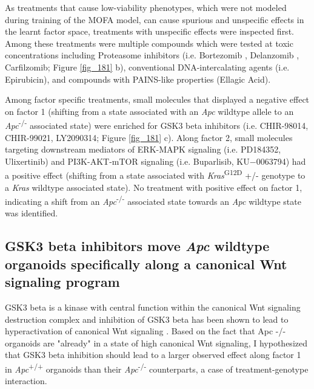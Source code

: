 \begin{flushleft}
As treatments that cause low-viability phenotypes, which were not modeled during training of the MOFA model, can cause spurious and unspecific effects in the learnt factor space, treatments with unspecific effects were inspected first. Among these treatments were multiple compounds which were tested at toxic concentrations including Proteasome inhibitors (i.e. Bortezomib , Delanzomib , Carfilzomib; Figure \ref{fig_181} b), conventional DNA-intercalating agents (i.e. Epirubicin), and compounds with PAINS-like properties (Ellagic Acid). 
\par

Among factor specific treatments, small molecules that displayed a negative effect on factor 1 (shifting from a state associated with an \textit{Apc} wildtype allele to an \textit{Apc}\textsuperscript{-/-}  associated state) were enriched for GSK3 beta inhibitors (i.e. CHIR-98014, CHIR-99021, LY2090314; Figure \ref{fig_181} c). Along factor 2, small molecules targeting downstream mediators of ERK-MAPK signaling (i.e.  PD184352, Ulixertinib) and PI3K-AKT-mTOR signaling (i.e. Buparlisib, KU−0063794) had a positive effect (shifting from a state associated with \textit{Kras}\textsuperscript{G12D} +/- genotype to a \textit{Kras} wildtype associated state). No treatment with positive effect on factor 1, indicating a shift from an \textit{Apc}\textsuperscript{-/-}  associated state towards an \textit{Apc} wildtype state was identified. 

\subsection{GSK3 beta inhibitors move \textit{Apc} wildtype organoids specifically along a canonical Wnt signaling program}

GSK3 beta is a kinase with central function within the canonical Wnt signaling destruction complex \citep{stamosVCateninDestructionComplex2013} and inhibition of GSK3 beta has been shown to lead to hyperactivation of canonical Wnt signaling \citep{stambolicLithiumInhibitsGlycogen1996}. Based on the fact that Apc -/- organoids are "already" in a state of high canonical Wnt signaling, I hypothesized that GSK3 beta inhibition should lead to a larger observed effect along factor 1 in \textit{Apc}\textsuperscript{+/+} organoids than their \textit{Apc}\textsuperscript{-/-}  counterparts, a case of treatment-genotype interaction. 


\end{flushleft}
